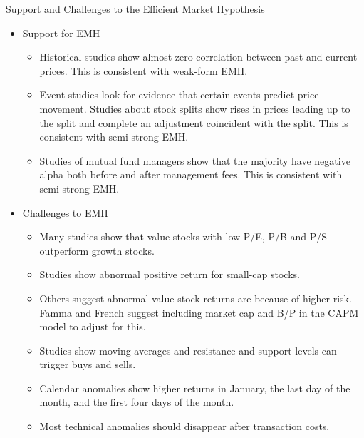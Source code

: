 \documentclass[../custom]{flashcards}
\newcommand{\studyArea}{Behavioral Finance}
\begin{document}
\begin{flashcard}[\studyArea]{Support and Challenges to the Efficient Market Hypothesis}
    \begin{itemize}[nosep]
        \item Support for EMH
            \begin{itemize}[nosep]
                \item Historical studies show almost zero correlation between past and current prices. This is consistent with weak-form EMH.
                \item Event studies look for evidence that certain events predict price movement. Studies about stock splits show rises in prices leading up to the split and complete an adjustment coincident with the split. This is consistent with semi-strong EMH.
                \item Studies of mutual fund managers show that the majority have negative alpha both before and after management fees. This is consistent with semi-strong EMH.
            \end{itemize}
        \item Challenges to EMH
            \begin{itemize}[nosep]
                \item Many studies show that value stocks with low P/E, P/B and P/S outperform growth stocks.
                \item Studies show abnormal positive return for small-cap stocks.
                \item Others suggest abnormal value stock returns are because of higher risk. Famma and French suggest including market cap and B/P in the CAPM model to adjust for this.
                \item Studies show moving averages and resistance and support levels can trigger buys and sells.
                \item Calendar anomalies show higher returns in January, the last day of the month, and the first four days of the month.
                \item Most technical anomalies should disappear after transaction costs.
            \end{itemize}
    \end{itemize}
\end{flashcard}
\end{document}
